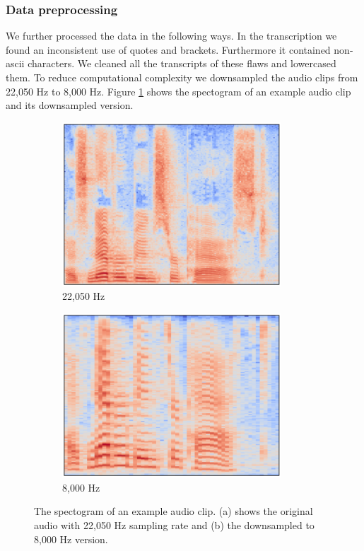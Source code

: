 \documentclass[11pt]{article}
\begin{document}
\subsubsection*{Data preprocessing}

We further processed the data in the following ways. In the transcription we found an inconsistent use of quotes and brackets. Furthermore it contained non-ascii characters. We cleaned all the transcripts of these flaws and lowercased them. To reduce computational complexity we downsampled the audio clips from 22,050 Hz to 8,000 Hz. Figure \ref{fig:downsampled} shows the spectogram of an example audio clip and its downsampled version.
\begin{figure}
\begin{subfigure}{0.5\textwidth}
\centering
    \includegraphics[width=0.9\textwidth]{image/original.pdf}
\caption{22,050 Hz}
\end{subfigure}%
\begin{subfigure}{0.5\textwidth}
\centering
\includegraphics[width=0.9\textwidth]{image/downsampled.pdf}
\caption{8,000 Hz}
\end{subfigure}
\caption{The spectogram of an example audio clip. (a) shows the original audio with 22,050 Hz sampling rate and (b) the downsampled to 8,000 Hz version.}{\label{fig:downsampled}}
\end{figure}
\end{document}
